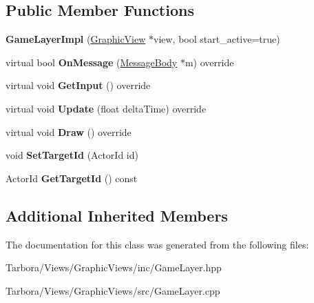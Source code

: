 \subsection*{Public Member Functions}
\begin{DoxyCompactItemize}
\item 
\mbox{\label{classTarbora_1_1GameLayerImpl_ae96df1359f37e2850008dde83a348f7f}} 
{\bfseries Game\+Layer\+Impl} (\hyperlink{classTarbora_1_1GraphicView}{Graphic\+View} $\ast$view, bool start\+\_\+active=true)
\item 
\mbox{\label{classTarbora_1_1GameLayerImpl_aaa12f4d9e7d3cea6a2095b76248fac83}} 
virtual bool {\bfseries On\+Message} (\hyperlink{classTarbora_1_1MessageBody}{Message\+Body} $\ast$m) override
\item 
\mbox{\label{classTarbora_1_1GameLayerImpl_a2ca17d3af2ffbdd4bdf3a6f1fbd0b62d}} 
virtual void {\bfseries Get\+Input} () override
\item 
\mbox{\label{classTarbora_1_1GameLayerImpl_a1cf535da3b752490b5de5bd2df719942}} 
virtual void {\bfseries Update} (float delta\+Time) override
\item 
\mbox{\label{classTarbora_1_1GameLayerImpl_a818b88ba9853bd72b1a11fc9f1df2b2d}} 
virtual void {\bfseries Draw} () override
\item 
\mbox{\label{classTarbora_1_1GameLayerImpl_a0f3e332d0e0a237cb51de7fe5935a2cd}} 
void {\bfseries Set\+Target\+Id} (Actor\+Id id)
\item 
\mbox{\label{classTarbora_1_1GameLayerImpl_ade4c1f74eca8d20d870cdd2b4d61361f}} 
Actor\+Id {\bfseries Get\+Target\+Id} () const
\end{DoxyCompactItemize}
\subsection*{Additional Inherited Members}


The documentation for this class was generated from the following files\+:\begin{DoxyCompactItemize}
\item 
Tarbora/\+Views/\+Graphic\+Views/inc/Game\+Layer.\+hpp\item 
Tarbora/\+Views/\+Graphic\+Views/src/Game\+Layer.\+cpp\end{DoxyCompactItemize}

